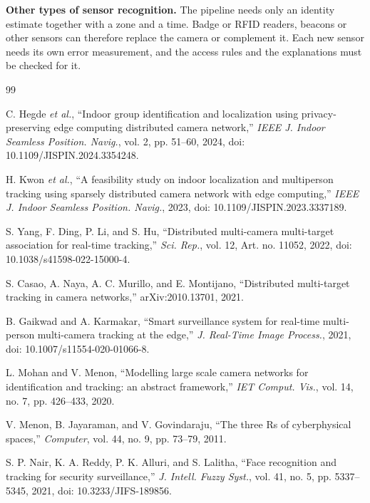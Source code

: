 \documentclass[12pt,a4paper,oneside]{report}
\begin{document}
\textbf{Other types of sensor recognition.} The pipeline needs only an identity estimate together with a zone and a time. Badge or RFID readers, beacons or other sensors can therefore replace the camera or complement it. Each new sensor needs its own error measurement, and the access rules and the explanations must be checked for it.

\clearpage
\renewcommand{\bibname}{References}

\begin{thebibliography}{99}
{}

\setlength{\itemsep}{6pt}
\setlength{\parskip}{0pt}

C. Hegde \textit{et al.},
``Indoor group identification and localization using privacy-preserving edge computing distributed camera network,''
\textit{IEEE J. Indoor Seamless Position. Navig.},
vol. 2, pp. 51--60,
2024, doi: 10.1109/JISPIN.2024.3354248.

H. Kwon \textit{et al.},
``A feasibility study on indoor localization and multiperson tracking using sparsely distributed camera network with edge computing,''
\textit{IEEE J. Indoor Seamless Position. Navig.},
2023, doi: 10.1109/JISPIN.2023.3337189.

S. Yang, F. Ding, P. Li, and S. Hu,
``Distributed multi-camera multi-target association for real-time tracking,''
\textit{Sci. Rep.},
vol. 12,
Art. no. 11052, 2022,
doi: 10.1038/s41598-022-15000-4.

S. Casao, A. Naya, A. C. Murillo, and E. Montijano,
``Distributed multi-target tracking in camera networks,''
arXiv:2010.13701, 2021.

B. Gaikwad and A. Karmakar,
``Smart surveillance system for real-time multi-person multi-camera tracking at the edge,''
\textit{J. Real-Time Image Process.},
2021, doi: 10.1007/s11554-020-01066-8.

L. Mohan and V. Menon,
``Modelling large scale camera networks for identification and tracking: an abstract framework,''
\textit{IET Comput. Vis.},
vol. 14, no. 7, pp. 426--433,
2020.

V. Menon, B. Jayaraman, and V. Govindaraju,
``The three Rs of cyberphysical spaces,''
\textit{Computer},
vol. 44, no. 9, pp. 73--79,
2011.

S. P. Nair, K. A. Reddy, P. K. Alluri, and S. Lalitha,
``Face recognition and tracking for security surveillance,''
\textit{J. Intell. Fuzzy Syst.},
vol. 41, no. 5, pp. 5337--5345,
2021, doi: 10.3233/JIFS-189856.


\end{thebibliography}
\end{document}
